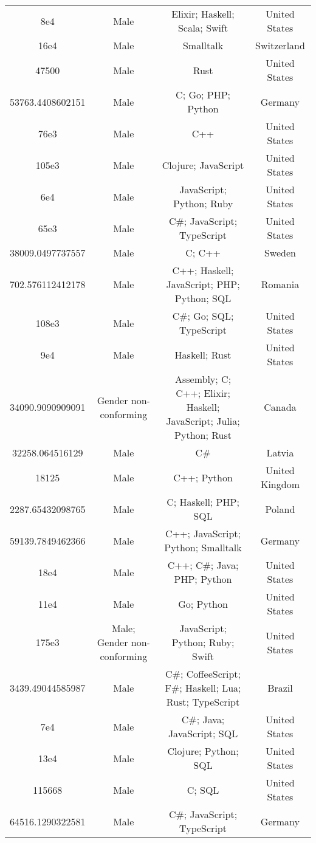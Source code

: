 \begin{center}
\begin{tabular}{ |c|c|c|c| }
8e4  &  Male  &  Elixir; Haskell; Scala; Swift  &  United States  \\ 
16e4  &  Male  &  Smalltalk  &  Switzerland  \\ 
47500  &  Male  &  Rust  &  United States  \\ 
53763.4408602151  &  Male  &  C; Go; PHP; Python  &  Germany  \\ 
76e3  &  Male  &  C++  &  United States  \\ 
105e3  &  Male  &  Clojure; JavaScript  &  United States  \\ 
6e4  &  Male  &  JavaScript; Python; Ruby  &  United States  \\ 
65e3  &  Male  &  C\#; JavaScript; TypeScript  &  United States  \\ 
38009.0497737557  &  Male  &  C; C++  &  Sweden  \\ 
702.576112412178  &  Male  &  C++; Haskell; JavaScript; PHP; Python; SQL  &  Romania  \\ 
108e3  &  Male  &  C\#; Go; SQL; TypeScript  &  United States  \\ 
9e4  &  Male  &  Haskell; Rust  &  United States  \\ 
34090.9090909091  &  Gender non-conforming  &  Assembly; C; C++; Elixir; Haskell; JavaScript; Julia; Python; Rust  &  Canada  \\ 
32258.064516129  &  Male  &  C\#  &  Latvia  \\ 
18125  &  Male  &  C++; Python  &  United Kingdom  \\ 
2287.65432098765  &  Male  &  C; Haskell; PHP; SQL  &  Poland  \\ 
59139.7849462366  &  Male  &  C++; JavaScript; Python; Smalltalk  &  Germany  \\ 
18e4  &  Male  &  C++; C\#; Java; PHP; Python  &  United States  \\ 
11e4  &  Male  &  Go; Python  &  United States  \\ 
175e3  &  Male; Gender non-conforming  &  JavaScript; Python; Ruby; Swift  &  United States  \\ 
3439.49044585987  &  Male  &  C\#; CoffeeScript; F\#; Haskell; Lua; Rust; TypeScript  &  Brazil  \\ 
7e4  &  Male  &  C\#; Java; JavaScript; SQL  &  United States  \\ 
13e4  &  Male  &  Clojure; Python; SQL  &  United States  \\ 
115668  &  Male  &  C; SQL  &  United States  \\ 
64516.1290322581  &  Male  &  C\#; JavaScript; TypeScript  &  Germany  \\ 

\end{tabular}
\end{center}
